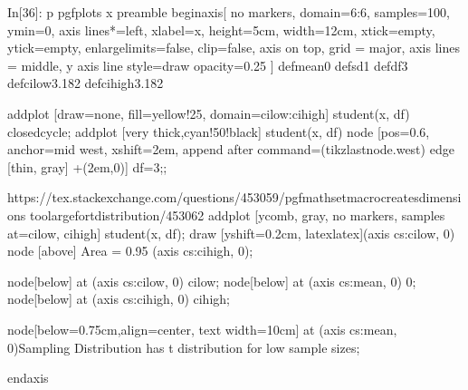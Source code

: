 \documentclass[float=false,crop=false]{standalone}
\begin{document}
\begin{InVerbatim}[commandchars=\\\{\},fontsize=\scriptsize]
{\color{incolor}In[{\color{incolor}36}]:}  \PYZhy{}p pgfplots \PYZhy{}x \PYZdl{}preamble
         \PYZbs{}begin\PYZob{}axis\PYZcb{}[
                 no markers,
                 domain=\PYZhy{}6:6,
                 samples=100,
                 ymin=0,
                 axis lines*=left,
                 xlabel=\PYZdl{}x\PYZdl{},
                 height=5cm,
                 width=12cm,
                 xtick=\PYZbs{}empty,
                 ytick=\PYZbs{}empty,
                 enlargelimits=false,
                 clip=false,
                 axis on top,
                 grid = major,
                 axis lines = middle,
                 y axis line style=\PYZob{}draw opacity=0.25\PYZcb{}
         ]
             \PYZbs{}def\PYZbs{}mean\PYZob{}0\PYZcb{}
             \PYZbs{}def\PYZbs{}sd\PYZob{}1\PYZcb{}
             \PYZbs{}def\PYZbs{}df\PYZob{}3\PYZcb{}
             \PYZbs{}def\PYZbs{}cilow\PYZob{}\PYZhy{}3.182\PYZcb{}
             \PYZbs{}def\PYZbs{}cihigh\PYZob{}3.182\PYZcb{}
         
             \PYZbs{}addplot [draw=none, fill=yellow!25, domain=\PYZbs{}cilow:\PYZbs{}cihigh] \PYZob{}student(x, \PYZbs{}df)\PYZcb{}
         \PYZbs{}closedcycle;
             \PYZbs{}addplot [very thick,cyan!50!black] \PYZob{}student(x, \PYZbs{}df)\PYZcb{} node [pos=0.6, anchor=mid
         west, xshift=2em, append after command=\PYZob{}(\PYZbs{}tikzlastnode.west) edge [thin, gray]
         +(\PYZhy{}2em,0)\PYZcb{}] \PYZob{}\PYZdl{}df=3\PYZdl{}\PYZcb{};;
         
             \PYZpc{}https://tex.stackexchange.com/questions/453059/pgfmathsetmacro\PYZhy{}creates\PYZhy{}dimensions\PYZhy{}
         too\PYZhy{}large\PYZhy{}for\PYZhy{}t\PYZhy{}distribution/453062
             \PYZbs{}addplot [ycomb, gray, no markers, samples at=\PYZob{}\PYZbs{}cilow, \PYZbs{}cihigh\PYZcb{}] \PYZob{}student(x, \PYZbs{}df)\PYZcb{};
             \PYZbs{}draw [yshift=0.2cm, latex\PYZhy{}latex](axis cs:\PYZbs{}cilow, 0) \PYZhy{}\PYZhy{} node [above] \PYZob{}Area = \PYZdl{}0.95\PYZdl{}\PYZcb{}
         (axis cs:\PYZbs{}cihigh, 0);
         
             \PYZbs{}node[below] at (axis cs:\PYZbs{}cilow, 0)  \PYZob{}\PYZbs{}cilow\PYZcb{};
             \PYZbs{}node[below] at (axis cs:\PYZbs{}mean, 0)  \PYZob{}0\PYZcb{};
             \PYZbs{}node[below] at (axis cs:\PYZbs{}cihigh, 0)  \PYZob{}\PYZbs{}cihigh\PYZcb{};
         
         
             \PYZbs{}node[below=0.75cm,align=center, text width=10cm] at (axis cs:\PYZbs{}mean, 0)\PYZob{}Sampling
         Distribution has \PYZdl{}t\PYZdl{} distribution for low sample sizes\PYZcb{};
         
         \PYZbs{}end\PYZob{}axis\PYZcb{}
\end{InVerbatim}
\end{document}

